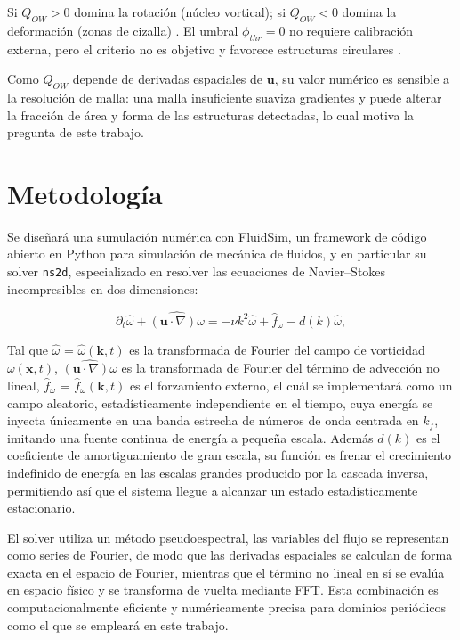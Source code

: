 Si $Q_{OW}>0$ domina la rotación (núcleo vortical); si $Q_{OW}<0$ domina 
la deformación (zonas de cizalla) \cite{okubo1970,weiss1991}. 
El umbral $\phi_{thr}=0$ no requiere calibración externa, pero 
el criterio no es objetivo y favorece estructuras circulares 
\cite{wang2023}. 

Como $Q_{OW}$ depende de derivadas espaciales de $\mathbf{u}$, 
su valor numérico es sensible a la resolución de malla: una malla insuficiente 
suaviza gradientes y puede alterar la fracción de área y forma de las 
estructuras detectadas, lo cual motiva la pregunta de este trabajo.

\section{Metodología}

Se diseñará una sumulación numérica con FluidSim, un framework de código 
abierto en Python para simulación de mecánica de fluidos, y en particular su 
solver \texttt{ns2d}, especializado en resolver las ecuaciones de Navier--Stokes 
incompresibles en dos dimensiones:

\begin{equation}
\partial_t \hat\omega + \widehat{(\mathbf{u}\cdot\nabla)\omega} 
= -\nu k^2\hat\omega + \hat f_\omega - d(k)\hat\omega,
\label{eq:vorticidad_forzada}
\end{equation}

Tal que $\hat\omega$ = $\hat\omega(\mathbf{k},t)$ es la transformada de Fourier del campo de 
vorticidad $\omega(\mathbf{x},t)$, $\widehat{(\mathbf{u}\cdot\nabla)\omega}$ 
es la transformada de Fourier del término de advección no lineal,
$\hat f_\omega$ = $\hat f_\omega(\mathbf{k},t)$ es el forzamiento externo, el cuál se implementará 
como un campo aleatorio, estadísticamente independiente en el tiempo, cuya 
energía se inyecta únicamente en una banda estrecha de números de onda 
centrada en $k_f$, imitando una fuente continua de energía a pequeña escala.
Además $d(k)$ es el coeficiente de amortiguamiento de gran escala, su función es frenar 
el crecimiento indefinido de energía en las escalas grandes producido por la 
cascada inversa, permitiendo así que el sistema llegue a alcanzar un estado 
estadísticamente estacionario.

El solver utiliza un método pseudoespectral, las variables del flujo se 
representan como series de Fourier, de modo que las derivadas espaciales se calculan de forma 
exacta en el espacio de Fourier, mientras que el término no lineal en sí se evalúa 
en espacio físico y se transforma de vuelta mediante FFT. Esta combinación es 
computacionalmente eficiente y numéricamente precisa para dominios periódicos como 
el que se empleará en este trabajo.


